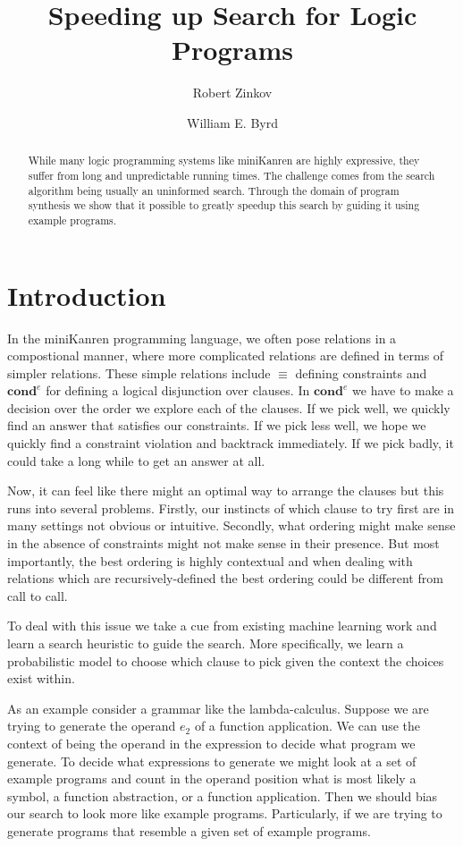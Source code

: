 \documentclass[submission,copyright,creativecommons]{eptcs}
\title{Speeding up Search for Logic Programs}
\author{Robert Zinkov
\institute{University of Oxford \\
Oxford, UK}
\email{zinkov@robots.ox.ac.uk}
\and
William E. Byrd
\institute{University of Alabama at Birmingham\\
Birmingham, AL, USA}
\email{webyrd@uab.edu}
}
\begin{document}
\maketitle

\begin{abstract}
  While many logic programming systems like miniKanren are highly
  expressive, they suffer from long and unpredictable running times.
  The challenge comes from the search algorithm being usually an
  uninformed search. Through the domain of program synthesis
  we show that it possible to greatly speedup this search by guiding
  it using example programs.
  
\end{abstract}

\section{Introduction}

In the miniKanren\cite{byrd2017unified} programming language, we often
pose relations in a compostional manner, where more complicated
relations are defined in terms of simpler relations. These simple
relations include $\equiv$ defining constraints and $\textbf{cond}^e$
for defining a logical disjunction over clauses. In $\textbf{cond}^e$
we have to make a decision over the order we explore each of the
clauses. If we pick well, we quickly find an answer that satisfies our
constraints. If we pick less well, we hope we quickly find a
constraint violation and backtrack immediately. If we pick badly, it
could take a long while to get an answer at all.

Now, it can feel like there might an optimal way to arrange the
clauses but this runs into several problems. Firstly, our instincts of
which clause to try first are in many settings not obvious or intuitive. Secondly,
what ordering might make sense in the absence of constraints might not make
sense in their presence. But most importantly, the best ordering is highly
contextual and when dealing with relations which are recursively-defined
the best ordering could be different from call to call.

To deal with this issue we take a cue from existing machine learning
work\cite{zaremba2014learning,lee2018accelerating} and learn a search
heuristic to guide the search. More specifically, we learn a
probabilistic model to choose which clause to pick given the context the
choices exist within.

As an example consider a grammar like the lambda-calculus. Suppose we
are trying to generate the operand $e_2$ of a function application. We
can use the context of being the operand in the expression to decide
what program we generate. To decide what expressions to generate we
might look at a set of example programs and count in the operand
position what is most likely a symbol, a function abstraction, or a
function application. Then we should bias our search to look more like
example programs. Particularly, if we are trying to generate programs
that resemble a given set of example programs.
\end{document}
